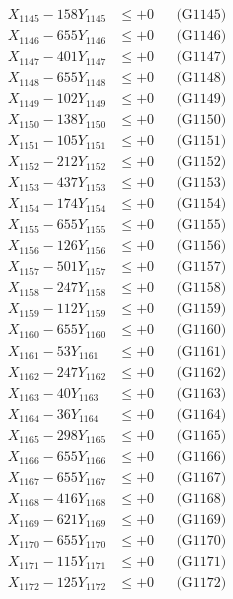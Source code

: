 \documentclass[a4paper,10pt]{article}
\begin{document}
{\begin{align}
X_{1145} - 158Y_{1145} &\leq +0 && \text{(G1145)} \\
X_{1146} - 655Y_{1146} &\leq +0 && \text{(G1146)} \\
X_{1147} - 401Y_{1147} &\leq +0 && \text{(G1147)} \\
X_{1148} - 655Y_{1148} &\leq +0 && \text{(G1148)} \\
X_{1149} - 102Y_{1149} &\leq +0 && \text{(G1149)} \\
X_{1150} - 138Y_{1150} &\leq +0 && \text{(G1150)} \\
\allowbreak
X_{1151} - 105Y_{1151} &\leq +0 && \text{(G1151)} \\
X_{1152} - 212Y_{1152} &\leq +0 && \text{(G1152)} \\
X_{1153} - 437Y_{1153} &\leq +0 && \text{(G1153)} \\
X_{1154} - 174Y_{1154} &\leq +0 && \text{(G1154)} \\
X_{1155} - 655Y_{1155} &\leq +0 && \text{(G1155)} \\
X_{1156} - 126Y_{1156} &\leq +0 && \text{(G1156)} \\
X_{1157} - 501Y_{1157} &\leq +0 && \text{(G1157)} \\
X_{1158} - 247Y_{1158} &\leq +0 && \text{(G1158)} \\
X_{1159} - 112Y_{1159} &\leq +0 && \text{(G1159)} \\
X_{1160} - 655Y_{1160} &\leq +0 && \text{(G1160)} \\
\allowbreak
X_{1161} - 53Y_{1161} &\leq +0 && \text{(G1161)} \\
X_{1162} - 247Y_{1162} &\leq +0 && \text{(G1162)} \\
X_{1163} - 40Y_{1163} &\leq +0 && \text{(G1163)} \\
X_{1164} - 36Y_{1164} &\leq +0 && \text{(G1164)} \\
X_{1165} - 298Y_{1165} &\leq +0 && \text{(G1165)} \\
X_{1166} - 655Y_{1166} &\leq +0 && \text{(G1166)} \\
X_{1167} - 655Y_{1167} &\leq +0 && \text{(G1167)} \\
X_{1168} - 416Y_{1168} &\leq +0 && \text{(G1168)} \\
X_{1169} - 621Y_{1169} &\leq +0 && \text{(G1169)} \\
X_{1170} - 655Y_{1170} &\leq +0 && \text{(G1170)} \\
\allowbreak
X_{1171} - 115Y_{1171} &\leq +0 && \text{(G1171)} \\
X_{1172} - 125Y_{1172} &\leq +0 && \text{(G1172)} \\

\end{align}}
\end{document}
